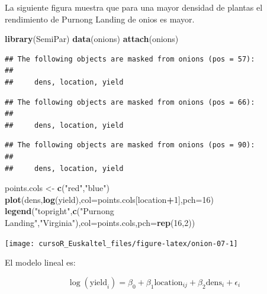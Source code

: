 \documentclass[]{book}
\newenvironment{Shaded}{\begin{snugshade}}{\end{snugshade}}
\newcommand{\KeywordTok}[1]{\textcolor[rgb]{0.13,0.29,0.53}{\textbf{#1}}}
\newcommand{\DataTypeTok}[1]{\textcolor[rgb]{0.13,0.29,0.53}{#1}}
\newcommand{\DecValTok}[1]{\textcolor[rgb]{0.00,0.00,0.81}{#1}}
\newcommand{\StringTok}[1]{\textcolor[rgb]{0.31,0.60,0.02}{#1}}
\newcommand{\OperatorTok}[1]{\textcolor[rgb]{0.81,0.36,0.00}{\textbf{#1}}}
\newcommand{\NormalTok}[1]{#1}
\begin{document}
La siguiente figura muestra que para una mayor densidad de plantas el
rendimiento de Purnong Landing de onios es mayor.

\begin{Shaded}
\begin{Highlighting}[]
\KeywordTok{library}\NormalTok{(SemiPar)}
\KeywordTok{data}\NormalTok{(onions)}
\KeywordTok{attach}\NormalTok{(onions)}
\end{Highlighting}
\end{Shaded}

\begin{verbatim}
## The following objects are masked from onions (pos = 57):
## 
##     dens, location, yield
\end{verbatim}

\begin{verbatim}
## The following objects are masked from onions (pos = 66):
## 
##     dens, location, yield
\end{verbatim}

\begin{verbatim}
## The following objects are masked from onions (pos = 90):
## 
##     dens, location, yield
\end{verbatim}

\begin{Shaded}
\begin{Highlighting}[]
\NormalTok{points.cols <-}\StringTok{ }\KeywordTok{c}\NormalTok{(}\StringTok{"red"}\NormalTok{,}\StringTok{"blue"}\NormalTok{)}
\KeywordTok{plot}\NormalTok{(dens,}\KeywordTok{log}\NormalTok{(yield),}\DataTypeTok{col=}\NormalTok{points.cols[location}\OperatorTok{+}\DecValTok{1}\NormalTok{],}\DataTypeTok{pch=}\DecValTok{16}\NormalTok{)}
\KeywordTok{legend}\NormalTok{(}\StringTok{"topright"}\NormalTok{,}\KeywordTok{c}\NormalTok{(}\StringTok{"Purnong Landing"}\NormalTok{,}\StringTok{"Virginia"}\NormalTok{),}\DataTypeTok{col=}\NormalTok{points.cols,}\DataTypeTok{pch=}\KeywordTok{rep}\NormalTok{(}\DecValTok{16}\NormalTok{,}\DecValTok{2}\NormalTok{))}
\end{Highlighting}
\end{Shaded}

\begin{center}\texttt{[image: cursoR\_Euskaltel\_files/figure-latex/onion-07-1]} \end{center}

El modelo lineal es:

\[
\log(\text{yield}_i) = \beta_0 + \beta_1\text{location}_{ij} + \beta_2 \text{dens}_i + \epsilon_i
\]
\end{document}
